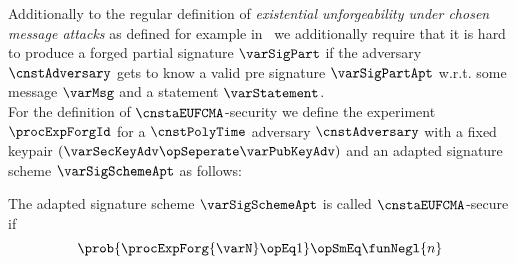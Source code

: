 \begin{definition}[$\cnstaEUFCMA$]\label{def:aeufcma}
Additionally to the regular definition of \textit{existential unforgeability under chosen message attacks} as defined for example in~\cite{vaudenay2006classical} we additionally require that it is hard to produce a forged partial signature $\varSigPart$ if the
adversary $\cnstAdversary$ gets to know a valid pre signature $\varSigPartApt$ w.r.t. some message $\varMsg$ and a statement $\varStatement$.\\
For the definition of $\cnstaEUFCMA$-security we define the experiment $\procExpForgId$ for a $\cnstPolyTime$ adversary $\cnstAdversary$ with a fixed keypair $(\varSecKeyAdv \opSeperate \varPubKeyAdv)$ and an adapted signature scheme $\varSigSchemeApt$ as
follows:\\
\begin{center}
    \fbox{
        \begin{varwidth}{\textwidth}
            \procedure[linenumbering, syntaxhighlight=auto]{$\procExpForg{\varN}$} {
                \varSet \opAssign \cnstEmptySet \\
                (\varNonceAdv \opSeperate \varRandAdv) \opFunResult \procSetupPartSig{\varSecParam} \\
                \varMsg \opFunResult \cnstAdversary^{\procSignOracle{\cdot}{\varSecKey}{\varPubKey}}(\varPubKeyAdv \opSeperate \varRandAdv) \\
                \varSigPartApt \opFunResult \procGenPtAptSig{\varMsg}{\varSecKey}{\varNonce}{\varPubKeyAdv}{\varRandAdv}{\varWit} \\
                \varSigPart \opFunResult \cnstAdversary^{\procSignOracle{\cdot}{\varSecKey}{\varPubKey}}(\varSigPartApt) \\
                \varSigFin \opFunResult \procFinAptSig{\varSigPart}{\varSigPartApt}{\varWit}{\varRand}{\varRandAdv} \\
                \pcreturn (\varMsg \opNotIn \varSet \opAnd \procVerf{\varMsg}{\varSigFin}{\varPubKeyAdv \opAddPoint \varPubKey})
            }\\[2\baselineskip]
            \procedure[linenumbering, syntaxhighlight=auto]{$\procSignOracle{\varMsg}{\varPubKeyAdv}{\varRandAdv}$} {
                \varSet \opAssign \varSet \opUnion {\varMsg} \\
                ((\varNonce \opSeperate \varRand) \opSeperate (\varWit \opSeperate \varStatement)) \opFunResult \procSetupApt{\varSecParam} \\
                \pcreturn \procGenPtAptSig{\varMsg}{\varSecKey}{\varNonce}{\varPubKeyAdv}{\varRandAdv}{\varWit}
            }\\[2\baselineskip]
        \end{varwidth}
    }
\end{center}
The adapted signature scheme $\varSigSchemeApt$ is called $\cnstaEUFCMA$-secure if
\[ \prob{\procExpForg{\varN} \opEq 1} \opSmEq \funNegl{n} \]
\end{definition}

